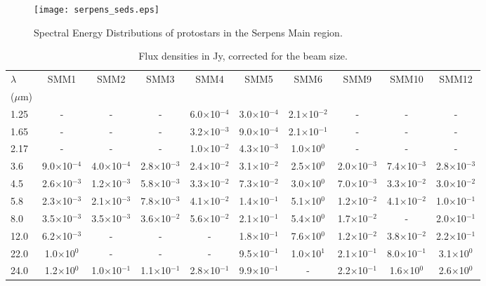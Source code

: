 \documentclass{aa}
\begin{document}
\begin{appendix}
\begin{figure} 
\texttt{[image: serpens\_seds.eps]} 
\caption{Spectral Energy Distributions of protostars in the Serpens Main region.} 
\label{seds} 
\end{figure}

\begin{table*} 
\caption{Flux densities in Jy, corrected for the beam size.}      
\centering       %
\label{SED_data}    

\begin{tabular}{l c c c c c c c c c} 
\hline 
$\lambda$ & SMM1  & SMM2  & SMM3 & SMM4 & SMM5  & SMM6 & SMM9 & SMM10 & SMM12 \\ 
($\mu$m) &  &  &  & & & & & & \\ 
\hline 
1.25 &- &- &- & 6.0$\times$10$^{-4}$ & 3.0$\times$10$^{-4}$ & 2.1$\times$10$^{-2}$ &- &- &-\\
1.65 &- &- &- & 3.2$\times$10$^{-3}$ & 9.0$\times$10$^{-4}$ & 2.1$\times$10$^{-1}$ &- &- &-\\
2.17 & -& -& -& 1.0$\times$10$^{-2}$ & 4.3$\times$10$^{-3}$ & 1.0$\times$10$^{0}$ & -&- &-\\
3.6 & 9.0$\times$10$^{-4}$ & 4.0$\times$10$^{-4}$ & 2.8$\times$10$^{-3}$ & 2.4$\times$10$^{-2}$ & 3.1$\times$10$^{-2}$ & 2.5$\times$10$^{0}$ & 2.0$\times$10$^{-3}$ & 7.4$\times$10$^{-3}$ & 2.8$\times$10$^{-3}$\\ 
4.5 & 2.6$\times$10$^{-3}$ & 1.2$\times$10$^{-3}$ & 5.8$\times$10$^{-3}$ & 3.3$\times$10$^{-2}$ & 7.3$\times$10$^{-2}$ & 3.0$\times$10$^{0}$ & 7.0$\times$10$^{-3}$ & 3.3$\times$10$^{-2}$ & 3.0$\times$10$^{-2}$\\ 
5.8 & 2.3$\times$10$^{-3}$ & 2.1$\times$10$^{-3}$ & 7.8$\times$10$^{-3}$ & 4.1$\times$10$^{-2}$ & 1.4$\times$10$^{-1}$ & 5.1$\times$10$^{0}$ & 1.2$\times$10$^{-2}$ & 4.1$\times$10$^{-2}$ & 1.0$\times$10$^{-1}$\\
8.0 & 3.5$\times$10$^{-3}$ & 3.5$\times$10$^{-3}$ & 3.6$\times$10$^{-2}$ & 5.6$\times$10$^{-2}$ & 2.1$\times$10$^{-1}$ & 5.4$\times$10$^{0}$ & 1.7$\times$10$^{-2}$ & - & 2.0$\times$10$^{-1}$\\ 
12.0 & 6.2$\times$10$^{-3}$ & - & - &- & 1.8$\times$10$^{-1}$ & 7.6$\times$10$^{0}$ & 1.2$\times$10$^{-2}$ & 3.8$\times$10$^{-2}$ & 2.2$\times$10$^{-1}$\\ 
22.0 & 1.0$\times$10$^{0}$ & - & - & -& 9.5$\times$10$^{-1}$ & 1.0$\times$10$^{1}$ & 2.1$\times$10$^{-1}$ & 8.0$\times$10$^{-1}$ & 3.1$\times$10$^{0}$\\ 
24.0 & 1.2$\times$10$^{0}$ & 1.0$\times$10$^{-1}$ & 1.1$\times$10$^{-1}$ & 2.8$\times$10$^{-1}$ & 9.9$\times$10$^{-1}$ &- & 2.2$\times$10$^{-1}$ & 1.6$\times$10$^{0}$ & 2.6$\times$10$^{0}$\\

\end{tabular}
\end{table*}
\end{appendix}
\end{document}

